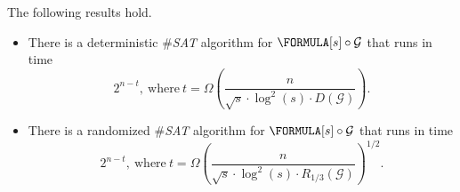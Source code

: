 \setcounter{theorem}{4}
	\begin{theorem}\label{thm:main_sat}
	The following results hold.
    	\begin{itemize}
    	    \item[\emph{1.}] There is a deterministic $\#$\emph{SAT} algorithm for $\FORMULA[s] \circ \mathcal{G}$ that runs in time
    	    $$
    	        2^{n - t},~\text{where}~t = \Omega\! \left ( \frac{n} {\sqrt{s} \cdot \log^2(s) \cdot D(\mathcal{G}) }\right).
    	    $$
    	    
    	    \item[\emph{2.}] There is a randomized $\#$\emph{SAT} algorithm for $\FORMULA[s] \circ \mathcal{G}$ that runs in time
    	    $$
    	        2^{n - t},~\text{where}~t = \Omega\! \left ( \frac{n} {\sqrt{s} \cdot \log^2(s) \cdot R_{1/3}(\mathcal{G}) }  \right )^{\! 1/2}.
    	    $$
    	\end{itemize}
	\end{theorem}
